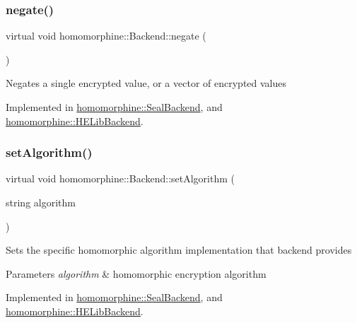 \subsubsection{\texorpdfstring{negate()}{negate()}}
{\footnotesize\ttfamily virtual void homomorphine\+::\+Backend\+::negate (\begin{DoxyParamCaption}{ }\end{DoxyParamCaption})\hspace{0.3cm}{\ttfamily [pure virtual]}}

Negates a single encrypted value, or a vector of encrypted values 

Implemented in \mbox{\hyperlink{classhomomorphine_1_1_seal_backend_a9064cf9822de85af9120528cef084bea}{homomorphine\+::\+Seal\+Backend}}, and \mbox{\hyperlink{classhomomorphine_1_1_h_e_lib_backend_acb1ed456fa91fc1dfe878abb068f3f34}{homomorphine\+::\+H\+E\+Lib\+Backend}}.

\mbox{\label{classhomomorphine_1_1_backend_a69cc49ddff047e257a7d793ac240b08b}} 
\subsubsection{\texorpdfstring{setAlgorithm()}{setAlgorithm()}}
{\footnotesize\ttfamily virtual void homomorphine\+::\+Backend\+::set\+Algorithm (\begin{DoxyParamCaption}\item[{string}]{algorithm }\end{DoxyParamCaption})\hspace{0.3cm}{\ttfamily [pure virtual]}}

Sets the specific homomorphic algorithm implementation that backend provides


\begin{DoxyParams}{Parameters}
{\em algorithm} & homomorphic encryption algorithm \\
\hline
\end{DoxyParams}


Implemented in \mbox{\hyperlink{classhomomorphine_1_1_seal_backend_a46a336bca80c5450a1f3ea1125d0d0e8}{homomorphine\+::\+Seal\+Backend}}, and \mbox{\hyperlink{classhomomorphine_1_1_h_e_lib_backend_a39478377b0e299fd90f5c7bb6c8efe89}{homomorphine\+::\+H\+E\+Lib\+Backend}}.

